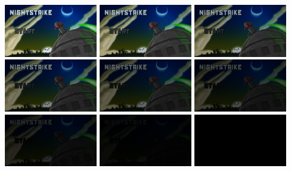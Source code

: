 \documentclass[10pt]{book}
\begin{document}
\begin{CJK}{UTF8}{gkai}
\begin{center}
\includegraphics[width=0.3\textwidth]{fade/0.png}
\includegraphics[width=0.3\textwidth]{fade/1.png}
\includegraphics[width=0.3\textwidth]{fade/2.png}
\includegraphics[width=0.3\textwidth]{fade/3.png}
\includegraphics[width=0.3\textwidth]{fade/4.png}
\includegraphics[width=0.3\textwidth]{fade/5.png}
\includegraphics[width=0.3\textwidth]{fade/6.png}
\includegraphics[width=0.3\textwidth]{fade/7.png}
\includegraphics[width=0.3\textwidth]{fade/8.png}
\end{center}


\end{CJK}
\end{document}
